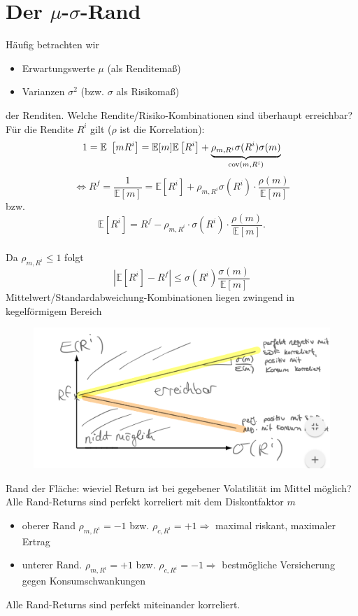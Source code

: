 \documentclass[12pt]{extreport} %
\theoremstyle{named}
\theoremstyle{nnamed}
\theoremstyle{itshape}
\theoremstyle{normal}
\begin{document}
\newpage

\section{Der $\mu$-$\sigma$-Rand}

Häufig betrachten wir
\begin{itemize}
	\item Erwartungswerte $\mu$ (als Renditemaß)
	\item Varianzen $\sigma^2$ (bzw. $\sigma$ als Risikomaß)
\end{itemize}
der Renditen. Welche Rendite/Risiko-Kombinationen sind überhaupt erreichbar? Für die Rendite $R^i$ gilt ($\rho$ ist die Korrelation):
	$$ 1 = \mathbb{E} \left[ m R^i \right] = \mathbb{E}[m] \mathbb{E} \left[ R^i \right] + \underbrace{\rho_{m, R^i} \sigma(R^i) \sigma(m)}_{\cov(m, R^i)} $$
	$$ \iff R^f = \frac{1}{\mathbb{E}[m]} = \mathbb{E} \left[ R^i \right] + \rho_{m, R^i} \sigma( R^i) \cdot \frac{\rho(m)}{\mathbb{E}[m]} $$
bzw.
	$$ \mathbb{E} \left[ R^i \right] =  R^f  - \rho_{m, R^i} \cdot \sigma( R^i) \cdot \frac{\rho(m)}{\mathbb{E}[m]}. $$
~\\
Da $\rho_{m, R^i} \leq 1$ folgt 
	$$ \left| \mathbb{E} \left[ R^i \right] - R^f \right| \leq \sigma (R^i) \frac{\sigma(m)}{\mathbb{E}[m]} $$
Mittelwert/Standardabweichung-Kombinationen liegen zwingend in kegelförmigem Bereich	

\begin{figure}[h!] \centering
	\includegraphics[scale=0.5]{img/p49}
\end{figure}	
	
Rand der Fläche: wieviel Return ist bei gegebener Volatilität im Mittel möglich? Alle Rand-Returns sind perfekt korreliert mit dem Diskontfaktor $m$
\begin{itemize}
	\item oberer Rand $\rho_{m, R^i} = -1$ bzw. $\rho_{c, R^i} = +1 \Rightarrow$ maximal riskant, maximaler Ertrag
	\item unterer Rand. $\rho_{m, R^i} = +1$ bzw. $\rho_{c, R^i} = -1 \Rightarrow$ bestmögliche Versicherung gegen Konsumschwankungen
\end{itemize}	
Alle Rand-Returns sind perfekt miteinander korreliert. ~\\
\end{document}
